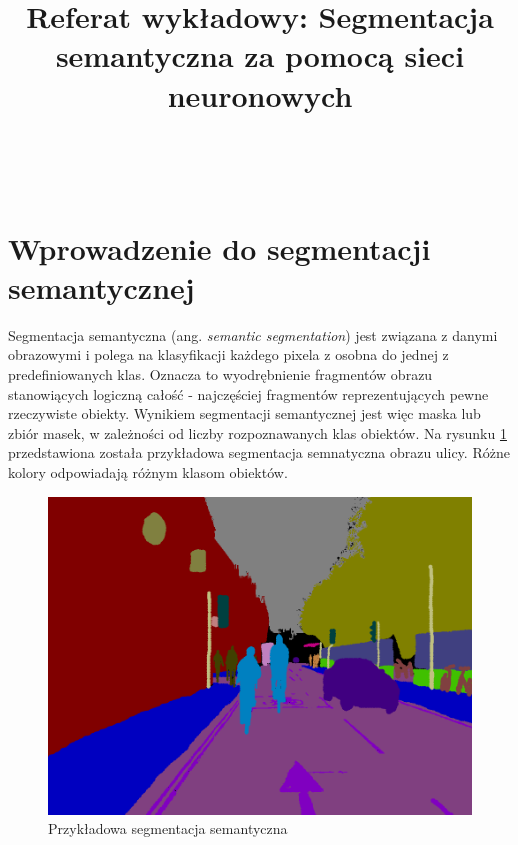 \documentclass{classrep}
\author{%
    \studentinfo[239671@edu.p.lodz.pl]{Jan Karwowski}{239671}\\
    \studentinfo[239676@edu.p.lodz.pl]{Kamil Kowalewski}{239676}\\
}
\title{Referat wykładowy: Segmentacja semantyczna za pomocą sieci neuronowych}
\begin{document}
    \maketitle
    \thispagestyle{fancyplain}

    \tableofcontents
    \newpage


    \section{Wprowadzenie do segmentacji semantycznej} {

        Segmentacja semantyczna (ang. \emph{semantic segmentation}) jest związana z danymi obrazowymi i
        polega na klasyfikacji każdego pixela z osobna do jednej z predefiniowanych klas. Oznacza to
        wyodrębnienie fragmentów obrazu stanowiących logiczną całość - najczęściej fragmentów
        reprezentujących pewne rzeczywiste obiekty. Wynikiem segmentacji semantycznej jest więc maska lub
        zbiór masek, w zależności od liczby rozpoznawanych klas obiektów. Na rysunku
        \ref{fig:semantic_segmentation_example} przedstawiona została przykładowa segmentacja semnatyczna
        obrazu ulicy. Różne kolory odpowiadają różnym klasom obiektów.

        \begin{figure}[!htbp]
            \centering
            \includegraphics[width=\textwidth]{img/semantic_segmentation_example.png}
            \caption{Przykładowa segmentacja semantyczna \cite{url:semantic_segmentation_example}}
            \label{fig:semantic_segmentation_example}
        \end{figure}
        \FloatBarrier

}
\end{document}
